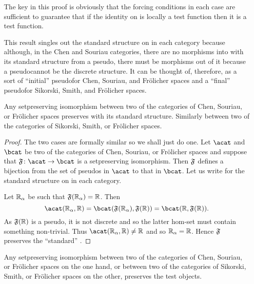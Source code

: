 \documentclass[%
a4paper,%
arxiv,%
defaults
]{myclass}
\begin{document}
The key in this proof is obviously that the forcing conditions in each case are sufficient to guarantee that if the identity on \R is locally a test function then it is a test function.

This result singles out the standard structure on \R in each category because although, in the Chen and Souriau categories, there are no morphisms into \R with its standard structure from a pseudo\enhyp{}\R, there must be morphisms out of it because a pseudo\enhyp{}\R cannot be the discrete structure.
It can be thought of, therefore, as a sort of ``initial'' pseudo\enhyp{}\R for Chen, Souriau, and Fr\"olicher spaces and a ``final'' pseudo\enhyp{}\R for Sikorski, Smith, and Fr\"olicher spaces.

\begin{corollary}
Any set\enhyp{}preserving isomorphism between two of the categories of Chen, Souriau, or Fr\"olicher spaces preserves \R with its standard structure.
Similarly between two of the categories of Sikorski, Smith, or Fr\"olicher spaces.
\end{corollary}

\begin{proof}
The two cases are formally similar so we shall just do one.
Let \(\acat\) and \(\bcat\) be two of the categories of Chen, Souriau, or Fr\"olicher spaces and suppose that \(\func{F} \colon \acat \to \bcat\) is a set\enhyp{}preserving isomorphism.
Then \(\func{F}\) defines a bijection from the set of pseudo\enhyp{}\R{}s in \(\acat\) to that in \(\bcat\).
Let us write \R for the standard structure on \R in each category.

Let \(\mathbb{R}_\alpha\) be such that \(\func{F}(\R_\alpha) = \R\).
Then
%
\[
  \Hom{\acat}{\R_\alpha}{\R} = \Hom{\bcat}{\func{F}(\R_\alpha)}{\func{F}(\R)} = \Hom{\bcat}{\R}{\func{F}(\R)}.
\]
%
As \(\func{F}(\R)\) is a pseudo\enhyp{}\R, it is not discrete and so the latter hom\hyp{}set must contain something non\hyp{}trivial.
Thus \(\Hom{\acat}{\R_\alpha}{\R} \ne \R\) and so \(\mathbb{R}_\alpha = \mathbb{R}\).
Hence \(\func{F}\) preserves the ``standard'' \R.
\end{proof}

\begin{corollary}
Any set\enhyp{}preserving isomorphism between two of the categories of Chen, Souriau, or Fr\"olicher spaces on the one hand, or between two of the categories of Sikorski, Smith, or Fr\"olicher spaces on the other, preserves the test objects.
\end{corollary}
\end{document}
